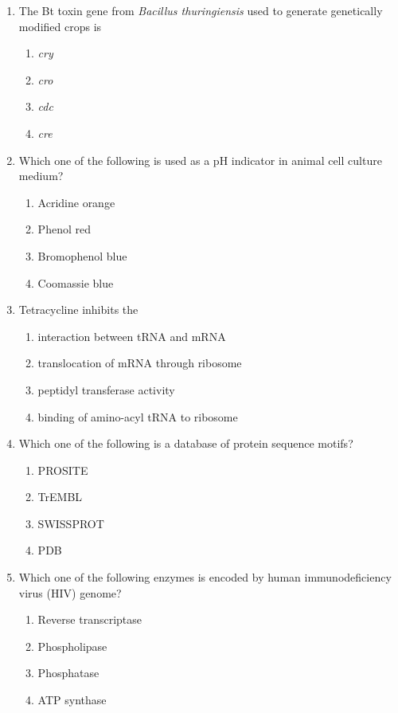 \documentclass[12pt]{article}
\begin{document}
\begin{enumerate}[label=Q.\arabic*]
	\item The Bt toxin gene from \textit{Bacillus thuringiensis} used to generate genetically modified crops is
		\begin{multicols}{4}
			\begin{enumerate}[label=(\Alph*)]
				\item \textit{cry}
				\item \textit{cro}
				\item \textit{cdc}
				\item \textit{cre}
			\end{enumerate}
		\end{multicols}

	\item Which one of the following is used as a pH indicator in animal cell culture medium?
		\begin{multicols}{2}
			\begin{enumerate}[label=(\Alph*)]
				\item Acridine orange
				\item Phenol red
				\item Bromophenol blue
				\item Coomassie blue
			\end{enumerate}
		\end{multicols}

	\item Tetracycline inhibits the
		\begin{enumerate}[label=(\Alph*)]
			\item interaction between tRNA and mRNA 
			\item translocation of mRNA through ribosome 
			\item peptidyl transferase activity 
			\item binding of amino-acyl tRNA to ribosome
		\end{enumerate}

	\item Which one of the following is a database of protein sequence motifs?
		\begin{multicols}{4}
			\begin{enumerate}[label=(\Alph*)]
				\item PROSITE
				\item TrEMBL
				\item SWISSPROT
				\item PDB
			\end{enumerate}
		\end{multicols}
	\item Which one of the following enzymes is encoded by human immunodeficiency virus (HIV) genome?
		\begin{multicols}{2}
			\begin{enumerate}[label=(\Alph*)]
				\item Reverse transcriptase
				\item Phospholipase
				\item Phosphatase
				\item ATP synthase
			\end{enumerate}
		\end{multicols}


\end{enumerate}
\end{document}
